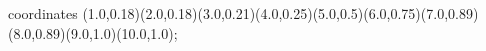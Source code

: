 					coordinates { (1.0,0.18)(2.0,0.18)(3.0,0.21)(4.0,0.25)(5.0,0.5)(6.0,0.75)(7.0,0.89)(8.0,0.89)(9.0,1.0)(10.0,1.0)};